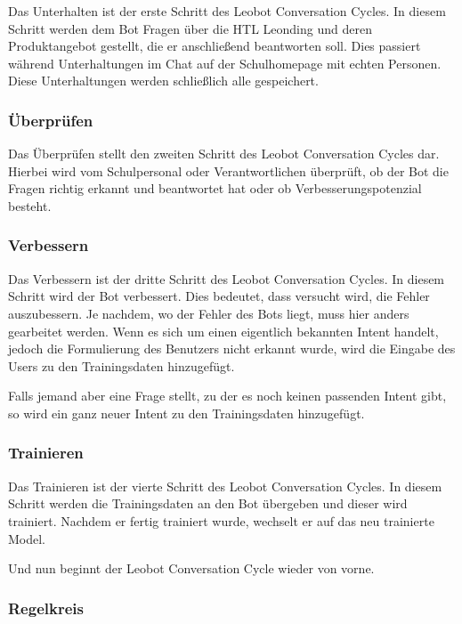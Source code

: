 Das Unterhalten ist der erste Schritt des Leobot Conversation Cycles.
In diesem Schritt werden dem Bot Fragen über die HTL Leonding und deren Produktangebot gestellt, die er anschließend beantworten soll.
Dies passiert während Unterhaltungen im Chat auf der Schulhomepage mit echten Personen.
Diese Unterhaltungen werden schließlich alle gespeichert.

\subsubsection{Überprüfen}

Das Überprüfen stellt den zweiten Schritt des Leobot Conversation Cycles dar.
Hierbei wird vom Schulpersonal oder Verantwortlichen überprüft, ob der Bot die Fragen richtig erkannt und beantwortet hat oder ob Verbesserungspotenzial besteht.

\subsubsection{Verbessern}

Das Verbessern ist der dritte Schritt des Leobot Conversation Cycles.
In diesem Schritt wird der Bot verbessert.
Dies bedeutet, dass versucht wird, die Fehler auszubessern.
Je nachdem, wo der Fehler des Bots liegt, muss hier anders gearbeitet werden.
Wenn es sich um einen eigentlich bekannten Intent handelt, jedoch die Formulierung des Benutzers nicht erkannt wurde, wird die Eingabe des Users zu den Trainingsdaten hinzugefügt.

Falls jemand aber eine Frage stellt, zu der es noch keinen passenden Intent gibt, so wird ein ganz neuer Intent zu den Trainingsdaten hinzugefügt.

\subsubsection{Trainieren}

Das Trainieren ist der vierte Schritt des Leobot Conversation Cycles.
In diesem Schritt werden die Trainingsdaten an den Bot übergeben und dieser wird trainiert.
Nachdem er fertig trainiert wurde, wechselt er auf das neu trainierte Model.

Und nun beginnt der Leobot Conversation Cycle wieder von vorne.

\subsubsection{Regelkreis}

